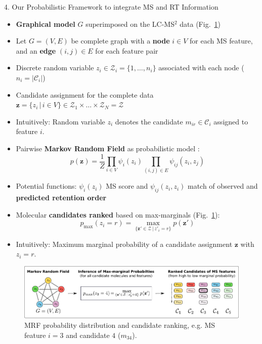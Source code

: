 \documentclass{beamer}
\newcommand{\ms}{MS}
\newcommand{\lc}{LC}
\newcommand{\msms}{\ms$^2$}
\newcommand{\lcmsms}{\lc-\msms}
\newcommand{\cands}{\mathcal{C}}
\newcommand{\seqlength}{N}
\begin{document}
\begin{frame}{}
\begin{columns}[T]
\hfill
{}
    \begin{block}{{\normalsize 4. Our Probabilistic Framework to integrate \ms{} and RT Information}}
    \begin{itemize}
        \item \textbf{Graphical model} $G$ superimposed on the \lcmsms{} data (Fig.~\ref{fig:mrf_and_ranking})
        \item Let $G=(V,E)$ be complete graph with a \textbf{node} $i\in V$ for each \ms{} feature, and an \textbf{edge} $(i,j)\in E$ for each feature pair 
        \item Discrete random variable $z_i\in\mathcal{Z}_i=\{1,\ldots,n_i\}$ associated with each node ($n_i=|\cands_i|$)
        \item Candidate assignment for the complete data $\mathbf{z}=\{z_i\,|\,i\in V\}\in\mathcal{Z}_1\times\ldots\times\mathcal{Z}_\seqlength=\mathcal{Z}$
        \item Intuitively: Random variable $z_i$ denotes the candidate $m_{ir}\in\mathcal{C}_i$ assigned to feature $i$.
        \item Pairwise \textbf{Markov Random Field} as probabilistic model \cite{MacKay2005}:
            \begin{equation}
                p(\mathbf{z})=\frac{1}{Z}\prod_{i\in V}\psi_i(z_i)\prod_{(i,j)\in E}\psi_{ij}(z_i,z_j)
                \label{eq:mrf}
            \end{equation} 
        \item Potential functions: $\psi_i(z_i)$ \ms{} score and $\psi_{ij}(z_i,z_i)$ match of observed and \textbf{predicted retention order}
        \item Molecular \textbf{candidates ranked} based on max-marginals \cite{MacKay2005} (Fig.~\ref{fig:mrf_and_ranking}):
            \begin{equation}
                p_{\max}(z_i=r)=\underset{\{\mathbf{z}'\in\mathcal{Z}\,|\,z'_i=r\}}{\max}p(\mathbf{z}')
            \end{equation}
        \item Intuitively: Maximum marginal probability of a candidate assignment $\mathbf{z}$ with $z_i=r$.
    \end{itemize}
    \vspace{0.25cm}
    \begin{figure}
        \centering
        \includegraphics[width=\textwidth]{images/mrf_and_ranking.pdf}
        \caption{MRF probability distribution and candidate ranking, e.g. \ms{} feature $i=3$ and candidate $4$ ($m_{34}$).}
        \label{fig:mrf_and_ranking}
    \end{figure}
    \vspace{-0.75cm}
    \end{block}


\end{columns}
\end{frame}
\end{document}
